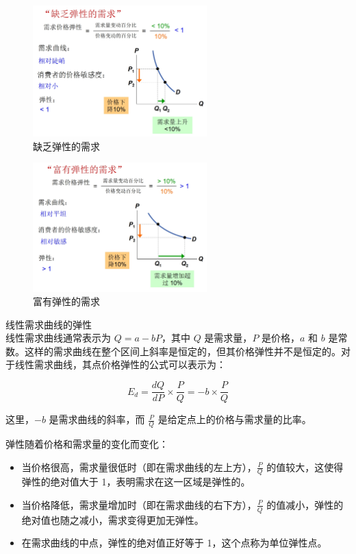\documentclass[12pt,a4paper]{article}
\begin{document}
\begin{figure}[H] 
  \centering %
  \includegraphics[width=0.6\textwidth]{缺乏弹性的需求.png} %
  \caption{缺乏弹性的需求} %
\end{figure}
\begin{figure}[H] 
  \centering %
  \includegraphics[width=0.6\textwidth]{富有弹性的需求.png} %
  \caption{富有弹性的需求} %
\end{figure}

线性需求曲线的弹性\\

线性需求曲线通常表示为 $Q = a - bP$，其中 $Q$ 是需求量，$P$ 是价格，$a$ 和 $b$ 是常数。这样的需求曲线在整个区间上斜率是恒定的，但其价格弹性并不是恒定的。对于线性需求曲线，其点价格弹性的公式可以表示为：

\[ E_d = \frac{dQ}{dP} \times \frac{P}{Q} = -b \times \frac{P}{Q} \]

这里，$-b$ 是需求曲线的斜率，而 $\frac{P}{Q}$ 是给定点上的价格与需求量的比率。

弹性随着价格和需求量的变化而变化：
\begin{itemize}
    \item 当价格很高，需求量很低时（即在需求曲线的左上方），$\frac{P}{Q}$ 的值较大，这使得弹性的绝对值大于 1，表明需求在这一区域是弹性的。
    \item 当价格降低，需求量增加时（即在需求曲线的右下方），$\frac{P}{Q}$ 的值减小，弹性的绝对值也随之减小，需求变得更加无弹性。
    \item 在需求曲线的中点，弹性的绝对值正好等于 1，这个点称为单位弹性点。
\end{itemize}
\end{document}
